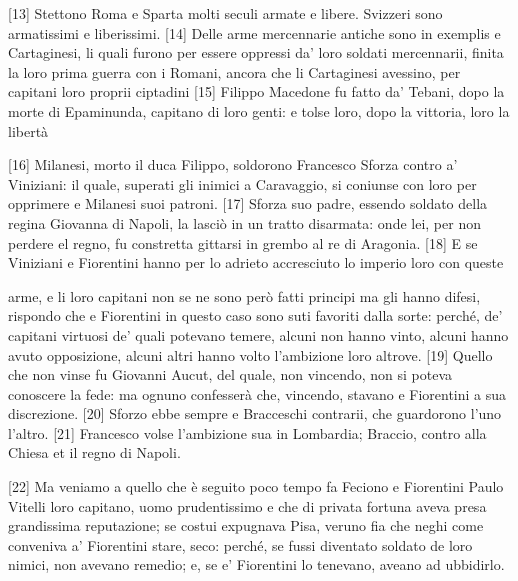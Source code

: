 {[}13{]} Stettono Roma e Sparta molti seculi armate e libere. Svizzeri
sono armatissimi e liberissimi. {[}14{]} Delle arme mercennarie antiche
sono in exemplis e Cartaginesi, li quali furono per essere oppressi da'
loro soldati mercennarii, finita la loro prima guerra con i Romani,
ancora che li Cartaginesi avessino, per capitani loro proprii ciptadini
{[}15{]} Filippo Macedone fu fatto da' Tebani, dopo la morte di
Epaminunda, capitano di loro genti: e tolse loro, dopo la vittoria, loro
la libertà

{[}16{]} Milanesi, morto il duca Filippo, soldorono Francesco Sforza
contro a' Viniziani: il quale, superati gli inimici a Caravaggio, si
coniunse con loro per opprimere e Milanesi suoi patroni. {[}17{]} Sforza
suo padre, essendo soldato della regina Giovanna di Napoli, la lasciò in
un tratto disarmata: onde lei, per non perdere el regno, fu constretta
gittarsi in grembo al re di Aragonia. {[}18{]} E se Viniziani e
Fiorentini hanno per lo adrieto accresciuto lo imperio loro con queste

\quebra

\noindent{}arme, e li loro capitani non se ne sono però fatti principi ma gli hanno
difesi, rispondo che e Fiorentini in questo caso sono suti favoriti
dalla sorte: perché, de' capitani virtuosi de' quali potevano temere,
alcuni non hanno vinto, alcuni hanno avuto opposizione, alcuni altri
hanno volto l'ambizione loro altrove.
{[}19{]} Quello che non vinse fu Giovanni Aucut, del quale, non
vincendo, non si poteva conoscere la fede: ma ognuno confesserà che,
vincendo, stavano e Fiorentini a sua discrezione. {[}20{]} Sforzo ebbe
sempre e Bracceschi contrarii, che guardorono l'uno l'altro. {[}21{]}
Francesco volse l'ambizione sua in Lombardia; Braccio, contro alla
Chiesa et il regno di Napoli.

{[}22{]} Ma veniamo a quello che è seguito poco tempo fa Feciono e
Fiorentini Paulo Vitelli loro capitano, uomo prudentissimo e che di
privata fortuna aveva presa grandissima reputazione; se costui expugnava
Pisa, veruno fia che neghi come conveniva a' Fiorentini stare, seco:
perché, se fussi diventato soldato de loro nimici, non avevano remedio;
e, se e' Fiorentini lo tenevano, aveano ad ubbidirlo.

